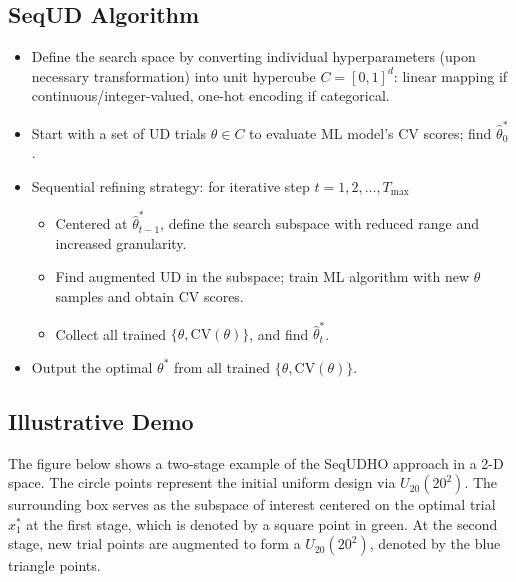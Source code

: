 \documentclass[letterpaper,10pt,english]{sphinxmanual}
\begin{document}
\subsection{SeqUD Algorithm}
\label{\detokenize{pysequd:sequd-algorithm}}\begin{itemize}
\item {} 
Define the search space by converting individual hyperparameters (upon necessary transformation) into unit hypercube \(C = [0,1]^d\): linear mapping if continuous/integer-valued, one-hot encoding if categorical.

\item {} 
Start with a set of UD trials \(\theta \in C\) to evaluate ML model’s CV scores; find \(\hat\theta_0^*\).

\item {} 
Sequential refining strategy: for iterative step \(t=1,2,\ldots,T_{\max}\)
\begin{itemize}
\item {} 
Centered at \(\hat\theta^*_{t-1}\), define the search subspace with reduced range and increased granularity.

\item {} 
Find augmented UD in the subspace; train ML algorithm with new \(\theta\) samples and obtain CV scores.

\item {} 
Collect all trained \(\{\theta, \mbox{CV}(\theta)\}\), and find \(\hat\theta_t^{*}\).

\end{itemize}

\item {} 
Output the optimal \(\theta^*\) from all trained \(\{\theta, \mbox{CV}(\theta)\}\).

\end{itemize}


\subsection{Illustrative Demo}
\label{\detokenize{pysequd:illustrative-demo}}
The figure below shows a two-stage example of the SeqUDHO approach in a 2-D space. The circle points represent the initial uniform design via \(U_{20}(20^{2})\). The surrounding box serves as the subspace of interest centered on the optimal trial \(x^{*}_{1}\) at the first stage, which is denoted by a square point in green. At the second stage, new trial points are augmented to form a \(U_{20}(20^{2})\), denoted by the blue triangle points.
\end{document}
